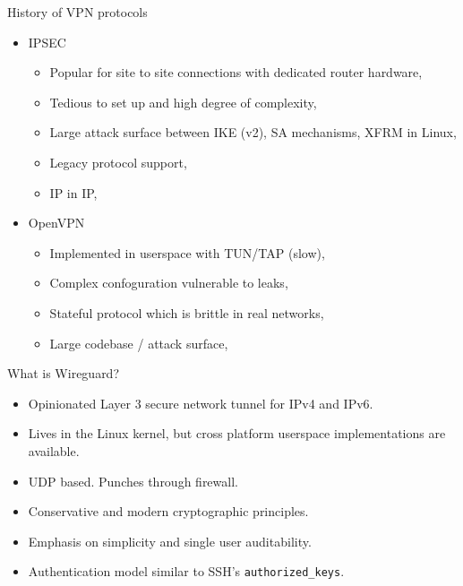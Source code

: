 \documentclass[xcolor=table]{beamer}
\begin{document}
    \begin{frame}{History of VPN protocols}
        \begin{itemize}
            \item IPSEC
                \begin{itemize}
                    \item Popular for site to site connections with dedicated router hardware,
                    \item Tedious to set up and high degree of complexity,
                    \item Large attack surface between IKE (v2), SA mechanisms, XFRM in Linux,
                    \item Legacy protocol support,
                    \item IP in IP,
                \end{itemize}
            \item OpenVPN
                \begin{itemize}
                    \item Implemented in userspace with TUN/TAP (slow),
                    \item Complex confoguration vulnerable to leaks,
                    \item Stateful protocol which is brittle in real networks,
                    \item Large codebase / attack surface,
                \end{itemize}
        \end{itemize}
    \end{frame}
    \begin{frame}{What is Wireguard?}
        \begin{itemize}
            \item Opinionated Layer 3 secure network tunnel for IPv4 and IPv6.
            \item Lives in the Linux kernel, but cross platform userspace implementations are available.
            \item UDP based. Punches through firewall.
            \item Conservative and modern cryptographic principles.
            \item Emphasis on simplicity and single user auditability.
            \item Authentication model similar to SSH's \texttt{authorized\_keys}.
        \end{itemize}
    \end{frame}
\end{document}
